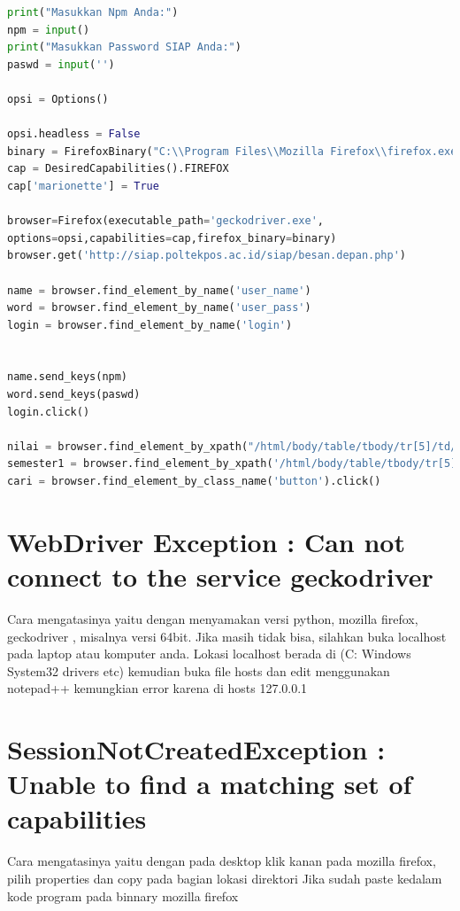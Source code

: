 \begin{enumerate}
\begin{lstlisting}[language=Python]
print("Masukkan Npm Anda:")
npm = input()
print("Masukkan Password SIAP Anda:")
paswd = input('')

opsi = Options()

opsi.headless = False
binary = FirefoxBinary("C:\\Program Files\\Mozilla Firefox\\firefox.exe")
cap = DesiredCapabilities().FIREFOX
cap['marionette'] = True

browser=Firefox(executable_path='geckodriver.exe',
options=opsi,capabilities=cap,firefox_binary=binary)
browser.get('http://siap.poltekpos.ac.id/siap/besan.depan.php')

name = browser.find_element_by_name('user_name')
word = browser.find_element_by_name('user_pass')
login = browser.find_element_by_name('login')


name.send_keys(npm)
word.send_keys(paswd)
login.click()

nilai = browser.find_element_by_xpath("/html/body/table/tbody/tr[5]/td/table[1]/tbody/tr/td[1]/table[2]/tbody/tr[1]/td[2]/a[5]").click()
semester1 = browser.find_element_by_xpath('/html/body/table/tbody/tr[5]/td/table[3]/tbody/tr[1]/td[2]/p[1]/table/tbody/tr/td[3]/select/option[4]').click()
cari = browser.find_element_by_class_name('button').click()

\end{lstlisting}

\end{enumerate}

\section{ WebDriver Exception : Can not connect to the service geckodriver}
Cara mengatasinya yaitu dengan menyamakan versi python, mozilla ﬁrefox, geckodriver , misalnya versi 64bit. Jika masih tidak bisa, silahkan buka localhost pada laptop atau komputer anda. Lokasi localhost berada di (C: Windows System32 drivers etc) kemudian buka ﬁle hosts dan edit menggunakan notepad++ kemungkian error karena di hosts 127.0.0.1


\section{SessionNotCreatedException : Unable to ﬁnd a matching set of capabilities}
Cara mengatasinya yaitu dengan pada desktop klik kanan pada mozilla ﬁrefox, pilih properties dan copy pada bagian lokasi direktori Jika sudah paste kedalam kode program pada binnary mozilla firefox


